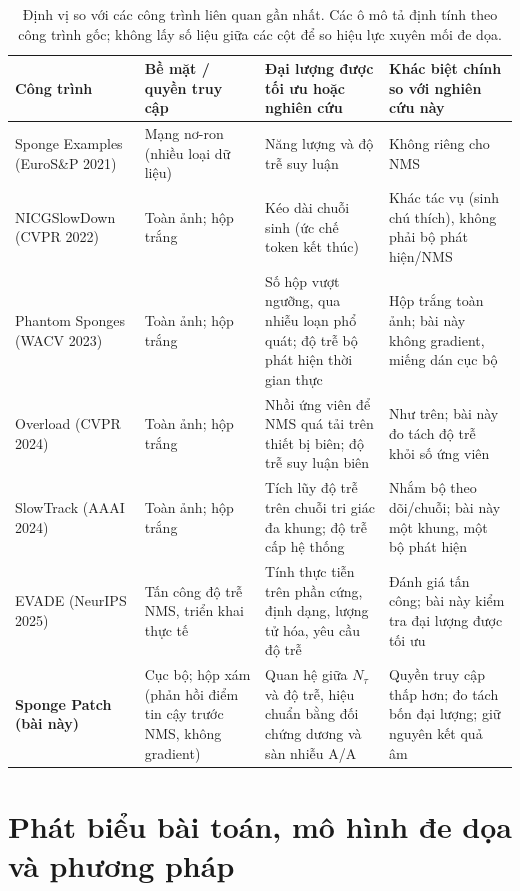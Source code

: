 \documentclass[a4paper,fleqn]{cas-dc}
\newcommand{\Ntau}{N_{\tau}}
\begin{document}
\begin{table}[!tp]
\centering\small
\caption{Định vị so với các công trình liên quan gần nhất. Các ô mô tả định tính theo công trình gốc; không lấy số liệu giữa các cột để so hiệu lực xuyên mối đe dọa.}
\label{tab:related}
\begin{tabularx}{\textwidth}{@{}p{2.8cm}p{3.1cm}p{3.6cm}X@{}}
\toprule
Công trình & Bề mặt / quyền truy cập & Đại lượng được tối ưu hoặc nghiên cứu & Khác biệt chính so với nghiên cứu này \\
\midrule
Sponge Examples \cite{shumailov2021sponge} (EuroS\&P 2021) & Mạng nơ-ron (nhiều loại dữ liệu) & Năng lượng và độ trễ suy luận & Không riêng cho NMS \\
NICGSlowDown \cite{nicgslowdown2022} (CVPR 2022) & Toàn ảnh; hộp trắng & Kéo dài chuỗi sinh (ức chế token kết thúc) & Khác tác vụ (sinh chú thích), không phải bộ phát hiện/NMS \\
Phantom Sponges \cite{phantom2023} (WACV 2023) & Toàn ảnh; hộp trắng & Số hộp vượt ngưỡng, qua nhiễu loạn phổ quát; độ trễ bộ phát hiện thời gian thực & Hộp trắng toàn ảnh; bài này không gradient, miếng dán cục bộ \\
Overload \cite{overload2024} (CVPR 2024) & Toàn ảnh; hộp trắng & Nhồi ứng viên để NMS quá tải trên thiết bị biên; độ trễ suy luận biên & Như trên; bài này đo tách độ trễ khỏi số ứng viên \\
SlowTrack \cite{slowtrack2024} (AAAI 2024) & Toàn ảnh; hộp trắng & Tích lũy độ trễ trên chuỗi tri giác đa khung; độ trễ cấp hệ thống & Nhắm bộ theo dõi/chuỗi; bài này một khung, một bộ phát hiện \\
EVADE \cite{evade2025} (NeurIPS 2025) & Tấn công độ trễ NMS, triển khai thực tế & Tính thực tiễn trên phần cứng, định dạng, lượng tử hóa, yêu cầu độ trễ & Đánh giá tấn công; bài này kiểm tra đại lượng được tối ưu \\
\textbf{Sponge Patch (bài này)} & Cục bộ; hộp xám (phản hồi điểm tin cậy trước NMS, không gradient) & Quan hệ giữa $\Ntau$ và độ trễ, hiệu chuẩn bằng đối chứng dương và sàn nhiễu A/A & Quyền truy cập thấp hơn; đo tách bốn đại lượng; giữ nguyên kết quả âm \\
\bottomrule
\end{tabularx}
\end{table}

\section{Phát biểu bài toán, mô hình đe dọa và phương pháp}
\label{sec:formal}
\end{document}
